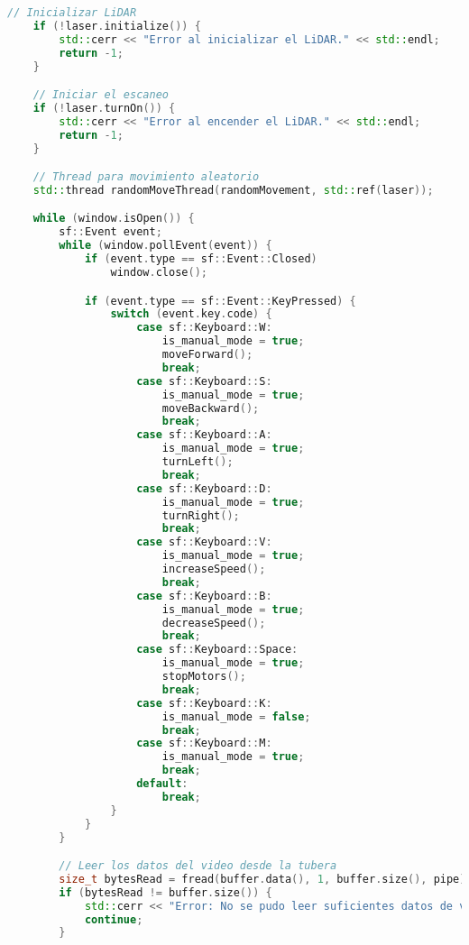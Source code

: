 \begin{lstlisting}[language={C++}, caption={Tercer ajuste de c\'odigo}, label={TercerAjuste}]
    // Inicializar LiDAR
    if (!laser.initialize()) {
        std::cerr << "Error al inicializar el LiDAR." << std::endl;
        return -1;
    }

    // Iniciar el escaneo
    if (!laser.turnOn()) {
        std::cerr << "Error al encender el LiDAR." << std::endl;
        return -1;
    }

    // Thread para movimiento aleatorio
    std::thread randomMoveThread(randomMovement, std::ref(laser));

    while (window.isOpen()) {
        sf::Event event;
        while (window.pollEvent(event)) {
            if (event.type == sf::Event::Closed)
                window.close();

            if (event.type == sf::Event::KeyPressed) {
                switch (event.key.code) {
                    case sf::Keyboard::W:
                        is_manual_mode = true;
                        moveForward();
                        break;
                    case sf::Keyboard::S:
                        is_manual_mode = true;
                        moveBackward();
                        break;
                    case sf::Keyboard::A:
                        is_manual_mode = true;
                        turnLeft();
                        break;
                    case sf::Keyboard::D:
                        is_manual_mode = true;
                        turnRight();
                        break;
                    case sf::Keyboard::V:
                        is_manual_mode = true;
                        increaseSpeed();
                        break;
                    case sf::Keyboard::B:
                        is_manual_mode = true;
                        decreaseSpeed();
                        break;
                    case sf::Keyboard::Space:
                        is_manual_mode = true;
                        stopMotors();
                        break;
                    case sf::Keyboard::K:
                        is_manual_mode = false;
                        break;
                    case sf::Keyboard::M:
                        is_manual_mode = true;
                        break;
                    default:
                        break;
                }
            }
        }

        // Leer los datos del video desde la tubera
        size_t bytesRead = fread(buffer.data(), 1, buffer.size(), pipe);
        if (bytesRead != buffer.size()) {
            std::cerr << "Error: No se pudo leer suficientes datos de video." << std::endl;
            continue;
        }


\end{lstlisting}
